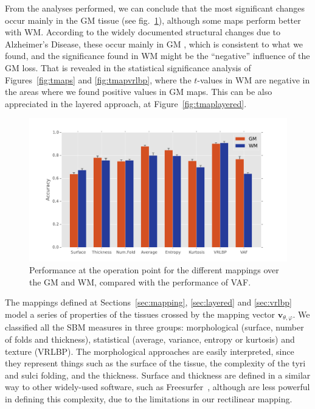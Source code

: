 From the analyses performed, we can conclude that the most significant changes occur mainly in the \ac{GM} tissue (see fig.~\ref{fig:performance}), although some maps perform better with \ac{WM}. According to the widely documented structural changes due to Alzheimer's Disease, these occur mainly in \ac{GM} \cite{Misra2009,Baron2001,Pievani2013,Stoeckel04,han2006reliability,Fischl2004}, which is consistent to what we found, and the significance found in \ac{WM} might be the ``negative'' influence of the \ac{GM} loss. That is revealed in the statistical significance analysis of Figures~\ref{fig:tmaps} and \ref{fig:tmapvrlbp}, where the $t$-values in \ac{WM} are negative in the areas where we found positive values in \ac{GM} maps. This can be also appreciated in the layered approach, at Figure~\ref{fig:tmaplayered}. 

\begin{figure}[htp]
	\centering
	\includegraphics[width=0.8\columnwidth]{Graphics/ch6/12-performance}
	\caption{Performance at the operation point for the different mappings over the \acs{GM} and \acs{WM}, compared with the performance of \acs{VAF}.}
	\label{fig:performance}
\end{figure}

The mappings defined at Sections~\ref{sec:mapping}, \ref{sec:layered} and \ref{sec:vrlbp} model a series of properties of the tissues crossed by the mapping vector $\mathbf{v}_{\theta,\varphi}$. We classified all the \ac{SBM} measures in three groups: morphological (surface, number of folds and thickness), statistical (average, variance, entropy or kurtosis) and texture (\ac{VRLBP}). The morphological approaches are easily interpreted, since they represent things such as the surface of the tissue, the complexity of the tyri and sulci folding, and the thickness. Surface and thickness are defined in a similar way to other widely-used software, such as Freesurfer~\cite{Dale1999,Fischl2004}, although are less powerful in defining this complexity, due to the limitations in our rectilinear mapping. 

